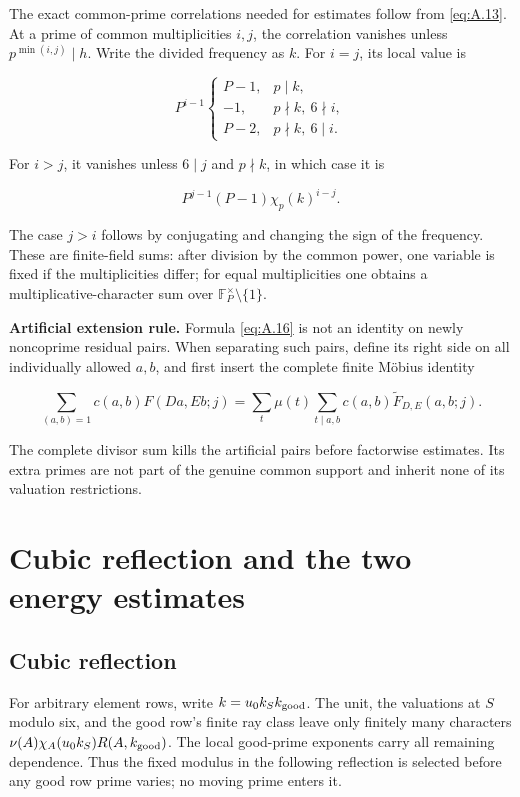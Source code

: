 \documentclass[11pt,a4paper]{article}
\begin{document}
The exact common-prime correlations needed for estimates follow from \eqref{eq:A.13}. At a prime of common multiplicities \(i,j\), the correlation vanishes unless \(p^{\min(i,j)}\mid h\). Write the divided frequency as \(k\). For \(i=j\), its local value is

\[
P^{i-1}\begin{cases}
P-1,&p\mid k,\\
-1,&p\nmid k,\ 6\nmid i,\\
P-2,&p\nmid k,\ 6\mid i.
\end{cases}
\tag{A.17}\label{eq:A.17}
\]

For \(i>j\), it vanishes unless \(6\mid j\) and \(p\nmid k\), in which case it is

\[
P^{j-1}(P-1)\chi_p(k)^{i-j}.
\tag{A.18}\label{eq:A.18}
\]

The case \(j>i\) follows by conjugating and changing the sign of the frequency. These are finite-field sums: after division by the common power, one variable is fixed if the multiplicities differ; for equal multiplicities one obtains a multiplicative-character sum over \(\mathbb F_P^\times\setminus\{1\}\).

\textbf{Artificial extension rule.} Formula \eqref{eq:A.16} is not an identity on newly noncoprime residual pairs. When separating such pairs, define its right side on all individually allowed \(a,b\), and first insert the complete finite Möbius identity

\[
\sum_{(a,b)=1}c(a,b)F(Da,Eb;j)
=\sum_t\mu(t)\sum_{t\mid a,b}c(a,b)\widetilde F_{D,E}(a,b;j).
\tag{A.19}\label{eq:A.19}
\]

The complete divisor sum kills the artificial pairs before factorwise estimates. Its extra primes are not part of the genuine common support and inherit none of its valuation restrictions.

\section{Cubic reflection and the two energy estimates}\label{sec:B}

\subsection{Cubic reflection}\label{sec:B.1}

For arbitrary element rows, write \(k=u_0k_Sk_{\rm good}\). The unit, the valuations at \(S\) modulo six, and the good row's finite ray class leave only finitely many characters \(\nu(A)\chi_A(u_0k_S)R(A,k_{\rm good})\). The local good-prime exponents carry all remaining dependence. Thus the fixed modulus in the following reflection is selected before any good row prime varies; no moving prime enters it.
\end{document}

